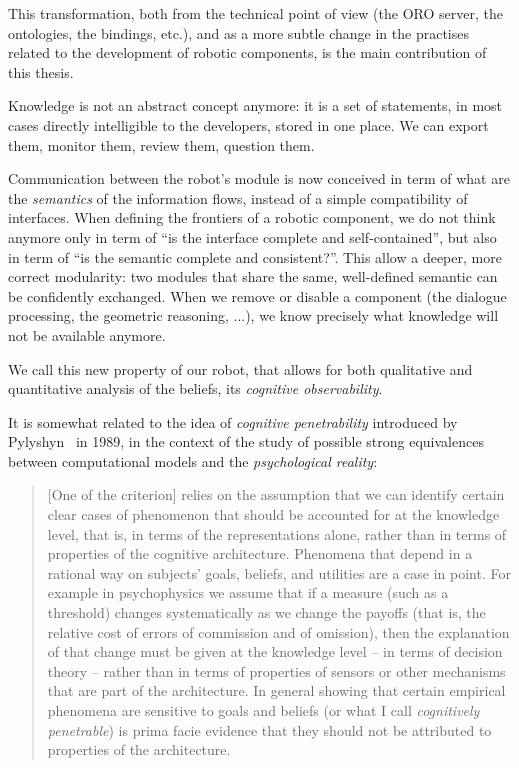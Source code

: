 This transformation, both from the technical point of view (the ORO server, the
ontologies, the bindings, etc.), and as a more subtle change in the practises
related to the development of robotic components, is the main contribution of
this thesis.

Knowledge is not an abstract concept anymore: it is a set of statements, in
most cases directly intelligible to the developers, stored in one place. We can
export them, monitor them, review them, question them.

Communication between the robot's module is now conceived in term of what are
the \emph{semantics} of the information flows, instead of a simple
compatibility of interfaces. When defining the frontiers of a robotic
component, we do not think anymore only in term of ``is the interface complete
and self-contained'', but also in term of ``is the semantic complete and
consistent?''. This allow a deeper, more correct modularity: two modules that
share the same, well-defined semantic can be confidently exchanged. When we
remove or disable a component (the dialogue processing, the geometric
reasoning, ...), we know precisely what knowledge will not be available
anymore.

We call this new property of our robot, that allows for both qualitative and
quantitative analysis of the beliefs, its \emph{cognitive observability}.

It is somewhat related to the idea of \emph{cognitive penetrability} introduced
by Pylyshyn~\cite{Pylyshyn1989} in 1989, in the context of the study of
possible strong equivalences between computational models and the
\emph{psychological reality}:

\begin{quote}

    [One of the criterion] relies on the assumption that we can identify
    certain clear cases of phenomenon that should be accounted for at the
    knowledge level, that is, in terms of the representations alone, rather
    than in terms of properties of the cognitive architecture. Phenomena that
    depend in a rational way on subjects' goals, beliefs, and utilities are a
    case in point. For example in psychophysics we assume that if a measure
    (such as a threshold) changes systematically as we change the payoffs (that
    is, the relative cost of errors of commission and of omission), then the
    explanation of that change must be given at the knowledge level -- in terms
    of decision theory -- rather than in terms of properties of sensors or
    other mechanisms that are part of the architecture. In general showing that
    certain empirical phenomena are sensitive to goals and beliefs (or what I
    call \emph{cognitively penetrable}) is prima facie evidence that they
    should not be attributed to properties of the architecture.

\end{quote}

